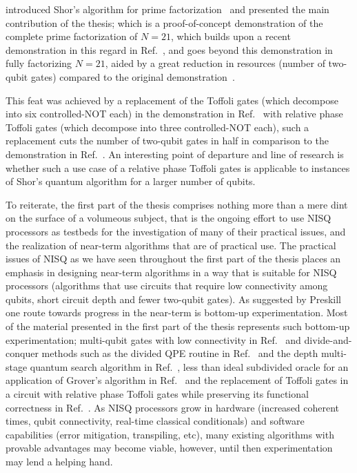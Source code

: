 \bigskip
\noindent
{} introduced Shor's algorithm for prime factorization~\cite{Shor_1997} and presented the main contribution of the thesis; which is a proof-of-concept demonstration of the complete prime factorization of $N=21$, which builds upon a recent demonstration in this regard in Ref.~\cite{Lopez_2012}, and goes beyond this demonstration in fully factorizing $N=21$, aided by a great reduction in resources (number of two-qubit gates) compared to the original demonstration~\cite{Skosana_2021}. 


\clearpage
\noindent
This feat was achieved by a replacement of the Toffoli gates (which decompose into six controlled-NOT each) in the demonstration in Ref.~\cite{Lopez_2012} with relative phase Toffoli gates (which decompose into three controlled-NOT each), such a replacement cuts the number of two-qubit gates in half in comparison to the demonstration in Ref.~\cite{Lopez_2012}. An interesting point of departure and line of research is whether such a use case of a relative phase Toffoli gates is applicable to instances of Shor's quantum algorithm for a larger number of qubits.

\bigskip
\noindent
To reiterate, the first part of the thesis comprises nothing more than a mere dint on the surface of a volumeous subject, that is the ongoing effort to use \acs{NISQ} processors as testbeds for the investigation of many of their practical issues, and the realization of near-term algorithms that are of practical use. The practical issues of \acs{NISQ} as we have seen throughout the first part of the thesis places an emphasis in designing near-term algorithms in a way that is suitable for \acs{NISQ} processors (algorithms that use circuits that require low connectivity among qubits, short circuit depth and fewer two-qubit gates). As suggested by Preskill~\cite{Preskill_2018} one route towards progress in the near-term is \via bottom-up experimentation. Most of the material presented in the first part of the thesis represents such bottom-up experimentation; multi-qubit gates with low connectivity in Ref.~\cite{Gwinner_2020} and divide-and-conquer methods such as the divided \acs{QPE} routine in Ref.~\cite{Amico_2019} and the depth multi-stage quantum search algorithm in Ref.~\cite{Zhang_2020}, less than ideal subdivided oracle for an application of Grover's algorithm in Ref.~\cite{Satoh_2020} and the replacement of Toffoli gates in a circuit with relative phase Toffoli gates while preserving its functional correctness in Ref.~\cite{Skosana_2021}. As \acs{NISQ} processors grow in hardware (increased coherent times, qubit connectivity, real-time classical conditionals) and software capabilities (error mitigation, transpiling, etc), many existing algorithms with provable advantages may become viable, however, until then experimentation may lend a helping hand.

